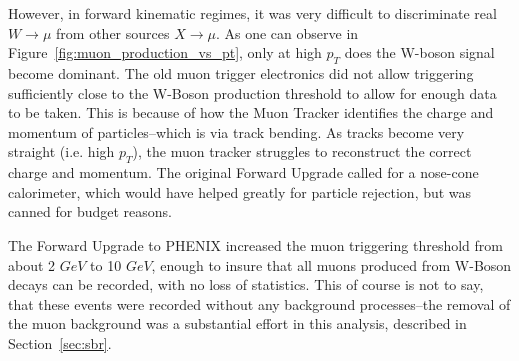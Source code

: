However, in forward kinematic regimes, it was very difficult to discriminate
real $W\rightarrow\mu$ from other sources $X\rightarrow\mu$. As one can observe
in Figure~\ref{fig:muon_production_vs_pt}, only at high $p_T$ does the W-boson
signal become dominant. The old muon trigger electronics did not allow
triggering sufficiently close to the W-Boson production threshold to allow for
enough data to be taken. This is because of how the Muon Tracker identifies the
charge and momentum of particles--which is via track bending. As tracks become
very straight (i.e. high $p_T$), the muon tracker struggles to reconstruct the
correct charge and momentum. The original Forward Upgrade called for a nose-cone
calorimeter, which would have helped greatly for particle rejection, but was
canned for budget reasons.

The Forward Upgrade to PHENIX increased the muon triggering threshold from about
2 $GeV$ to 10 $GeV$, enough to insure that all muons produced from W-Boson
decays can be recorded, with no loss of statistics. This of course is not to
say, that these events were recorded without any background processes--the
removal of the muon background was a substantial effort in this analysis,
described in Section~\ref{sec:sbr}.

